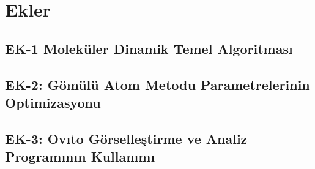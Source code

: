\titleformat{\section}[hang]{\normalsize\bfseries\scshape}{\thesection}{0.25cm}{\normalsize\bfseries\scshape}
\titlespacing*{\section}{0pt}{\parskip}{4mm}

\chapter*{Ekler}
\thispagestyle{empty}
\mathleft


\begin{justify}
\begin{small}
	\setlength{\parindent}{1cm}
	\hspace*{1cm}
\section*{EK-1 Moleküler Dinamik Temel Algoritması}	


\newpage
\section*{EK-2: Gömülü Atom Metodu Parametrelerinin Optimizasyonu}

\newpage
\section*{EK-3: Ovıto Görselleştirme ve Analiz Programının Kullanımı}

\newpage


\end{small}
\end{justify}
